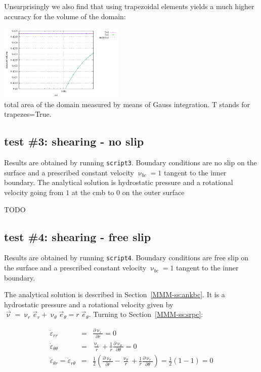 Unsurprisingly we also find that using trapezoidal elements yields a 
much higher accuracy for the volume of the domain:
\begin{center}
\includegraphics[width=6cm]{python_codes/fieldstone_151/results/test2/areas}\\
{\captionfont total area of the domain measured by means of Gauss integration.
T stands for {\python trapezes=True}.}
\end{center}



\subsection*{test \#3: shearing - no slip}

Results are obtained by running {\tt script3}. Boundary conditions are 
no slip on the surface and a prescribed constant velocity $\upnu_{bc}=1$ tangent 
to the inner boundary.
The analytical solution is hydrostatic pressure and a rotational velocity going from 
$1$ at the cmb to 0 on the outer surface

TODO




\subsection*{test \#4: shearing - free slip}

Results are obtained by running {\tt script4}. Boundary conditions are 
free slip on the surface and a prescribed constant velocity $\upnu_{bc}=1$ tangent 
to the inner boundary.

The analytical solution is described in Section~\ref{MMM-ss:ankbc}.
It is a hydrostatic pressure and a rotational velocity given by $\vec{\upnu}=\upnu_r \vec{e}_r + \upnu_\theta \vec{e}_\theta = r \; \vec{e}_\theta$.
Turning to Section~\ref{MMM-ss:srpc}:

\begin{eqnarray}
\dot\varepsilon_{rr}  &=& \frac{\partial \upnu_r}{\partial r}  = 0\\
\dot\varepsilon_{\theta\theta}  &=& \frac{\upnu_r}{r} + \frac{1}{r} \frac{\partial \upnu_\theta}{\partial \theta} =0 \\
\dot\varepsilon_{\theta r} = \dot\varepsilon_{r\theta}  &=& \frac{1}{2} \left(   \frac{\partial \upnu_\theta}{\partial r} - \frac{\upnu_\theta}{r} 
+\frac{1}{r} \frac{\partial \upnu_r}{\partial \theta}  \right)  = \frac12 (1-1) =0
\end{eqnarray}


